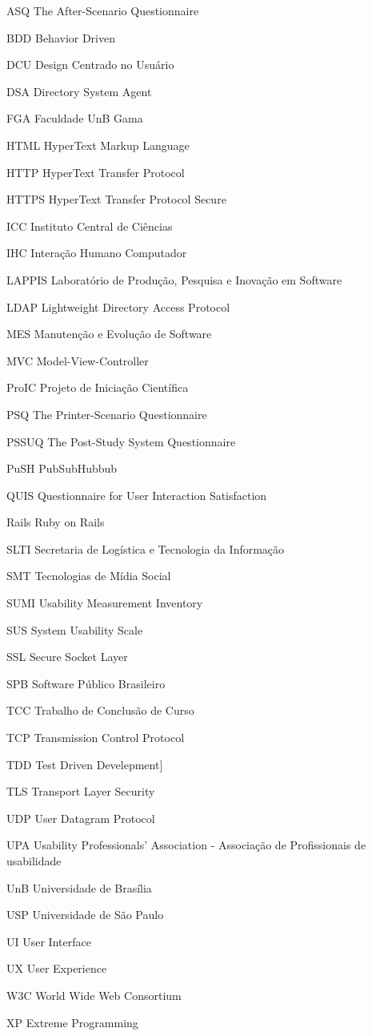 \begin{siglas}
  \item[ASQ] The After-Scenario Questionnaire
  \item[BDD] Behavior Driven 
  \item[DCU] Design Centrado no Usuário
  \item[DSA] Directory System Agent
  \item[FGA] Faculdade UnB Gama
  \item[HTML] HyperText Markup Language
  \item[HTTP] HyperText Transfer Protocol
  \item[HTTPS] HyperText Transfer Protocol Secure
  \item[ICC] Instituto Central de Ciências
  \item[IHC] Interação Humano Computador
  \item[LAPPIS] Laboratório de Produção, Pesquisa e Inovação em Software
  \item[LDAP] Lightweight Directory Access Protocol
  \item[MES] Manutenção e Evolução de Software
  \item[MVC] Model-View-Controller
  \item[ProIC] Projeto de Iniciação Científica
  \item[PSQ] The Printer-Scenario Questionnaire
  \item[PSSUQ] The Post-Study System Questionnaire
  \item[PuSH] PubSubHubbub
  \item[QUIS] Questionnaire for User Interaction Satisfaction
  \item[Rails] Ruby on Rails
  \item[SLTI] Secretaria de Logística e Tecnologia da Informação
  \item[SMT] Tecnologias de Mídia Social
  \item[SUMI] Usability Measurement Inventory
  \item[SUS] System Usability Scale
  \item[SSL] Secure Socket Layer
  \item[SPB] Software Público Brasileiro
  \item[TCC] Trabalho de Conclusão de Curso
  \item[TCP] Transmission Control Protocol
  \item[TDD] Test Driven Develepment]
  \item[TLS] Transport Layer Security
  \item[UDP] User Datagram Protocol
  \item{UPA} Usability Professionals' Association - Associação de Profissionais de usabilidade
  \item[UnB] Universidade de Brasília
  \item[USP] Universidade de São Paulo
  \item[UI] User Interface
  \item[UX] User Experience
  \item[W3C] World Wide Web Consortium
  \item[XP] Extreme Programming

\end{siglas}
